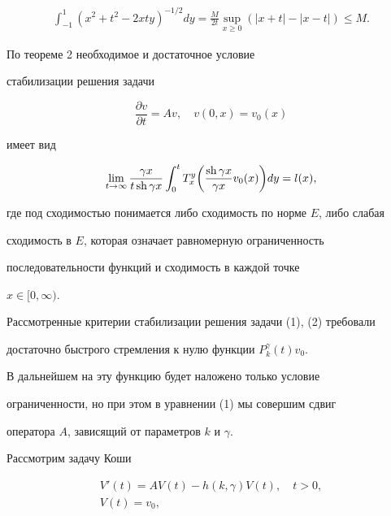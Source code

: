 \begin{exam}
\begin{multline*}
\int_{-1}^{1}


(x^2+t^2-2xty)^{-1/2} dy=\frac{M}{2t}


\sup_{x \geq 0}(|x+t|-|x-t|)\leq M.


\end{multline*}





По теореме 2 необходимое и достаточное условие


стабилизации решения задачи


$$


\frac{\partial v}{\partial t}=Av, \quad v(0,x)=v_0(x)


$$


имеет вид


$$


\lim_{t\to\infty}\frac{\gamma x}{t\sh \gamma x}


\int_{0}^{t}


T_x^y\bigg(\frac{\sh \gamma x}{\gamma x}v_0(x)\bigg) dy=l(x),


$$


где под сходимостью понимается либо сходимость по норме $E$, либо слабая


сходимость в $E$, которая означает равномерную ограниченность


последовательности функций и сходимость в каждой точке


$x\in [0,\infty )$.


\end{exam}





Рассмотренные критерии стабилизации решения задачи (1), (2) требовали


достаточно быстрого стремления к нулю функции $P_k^\gamma(t)v_0$.


В дальнейшем на эту функцию будет наложено только условие


ограниченности, но при этом в уравнении (1) мы совершим сдвиг


оператора $A$, зависящий от параметров $k$ и $\gamma$.





Рассмотрим задачу Коши


\begin{gather}


V'(t)=AV(t)-h(k,\gamma)V(t),\quad t>0,\\


V(t)=v_0,


\end{gather}


